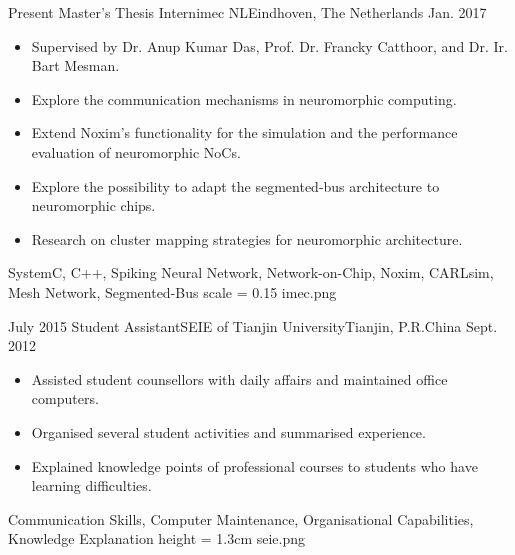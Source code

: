 %
%
%
%
%

\begin{experiences}
	\experience
    {Present}	{Master's Thesis Intern}{imec NL}{Eindhoven, The Netherlands}
    {Jan. 2017}	{
    				\begin{itemize}
                    	\item Supervised by Dr. Anup Kumar Das, Prof. Dr. Francky Catthoor, and Dr. Ir. Bart Mesman.
    					\item Explore the communication mechanisms in neuromorphic computing.
                        \item Extend Noxim's functionality for the simulation and the performance evaluation of neuromorphic NoCs.
                        \item Explore the possibility to adapt the segmented-bus architecture to neuromorphic chips. 
                        \item Research on cluster mapping strategies for neuromorphic architecture.
    				\end{itemize}
    			}
                {SystemC, C++, Spiking Neural Network, Network-on-Chip, Noxim, CARLsim, Mesh Network, Segmented-Bus}
     {scale = 0.15}		{imec.png} 
	\emptySeparator
    
    
    \experience
    {July 2015}	{Student Assistant}{SEIE of Tianjin University}{Tianjin, P.R.China}
    {Sept. 2012}	{
    				\begin{itemize}
                    	\item Assisted student counsellors with daily affairs and maintained office computers. 
    					\item Organised several student activities and summarised experience.
                        \item Explained knowledge points of professional courses to students who have learning difficulties.
    				\end{itemize}
    			}
                {Communication Skills, Computer Maintenance, Organisational Capabilities, Knowledge Explanation}
     {height = 1.3cm}		{seie.png} 
    
\end{experiences}